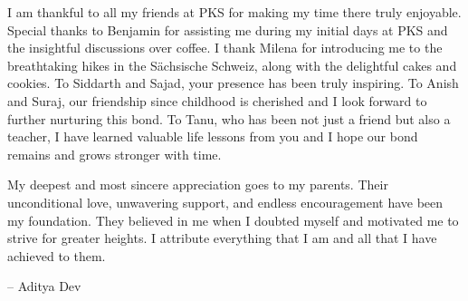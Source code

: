 I am thankful to all my friends at PKS for making my time there truly enjoyable. Special thanks to Benjamin for assisting me during my initial days at PKS and the insightful discussions over coffee. I thank Milena for introducing me to the breathtaking hikes in the Sächsische Schweiz, along with the delightful cakes and cookies. To Siddarth and Sajad, your presence has been truly inspiring. To Anish and Suraj, our friendship since childhood is cherished and I look forward to further nurturing this bond. To Tanu, who has been not just a friend but also a teacher, I have learned valuable life lessons from you and I hope our bond remains and grows stronger with time.

My deepest and most sincere appreciation goes to my parents. Their unconditional love, unwavering support, and endless encouragement have been my foundation. They believed in me when I doubted myself and motivated me to strive for greater heights. I attribute everything that I am and all that I have achieved to them. 


\vspace{1cm}

\hfill -- Aditya Dev

\newpage